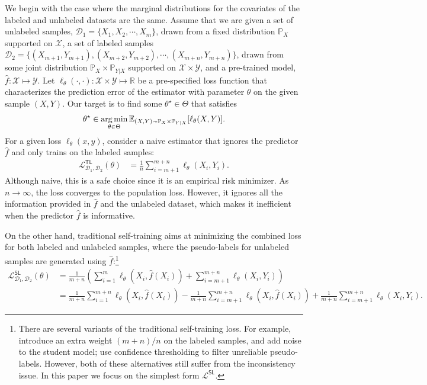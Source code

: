 We begin with the case where the marginal distributions for the covariates of the labeled and unlabeled datasets are the same. 
Assume that we are given a set of unlabeled samples, $\mathcal{D}_1 = \{X_1,X_2,\cdots, X_m\}$, drawn from a fixed distribution $\mathbb{P}_X$ supported on $\mathcal{X}$, a set of labeled samples $\mathcal{D}_2 =\{(X_{m+1}, Y_{m+1}), (X_{m+2}, Y_{m+2}), \cdots, (X_{m+n}, Y_{m+n})\}$, drawn from some joint distribution $\mathbb{P}_X\times \mathbb{P}_{Y|X}$ supported on $\mathcal{X}\times\mathcal{Y}$, and a pre-trained model,  $\hat f:\mathcal{X}\mapsto \mathcal{Y}$. Let $\ell_\theta(\cdot, \cdot):\mathcal{X}\times\mathcal{Y}\mapsto \mathbb{R}$ be a pre-specified loss function that characterizes the prediction error of the estimator with parameter $\theta$ on the given sample $(X, Y)$. 
Our target is to find some $\theta^\star\in\Theta$ that satisfies
\begin{align*}
    \theta^\star \in \operatorname*{arg\,min}_{\theta\in\Theta} \mathbb{E}_{(X, Y)\sim \mathbb{P}_{X}\times \mathbb{P}_{Y|X}}[\ell_\theta(X,Y)].
\end{align*}
For a given loss $\ell_\theta(x, y)$, consider a naive estimator that ignores the predictor $\hat f$ and only trains on the labeled samples:
\begin{align*}
\mathcal{L}^{\mathsf{TL}}_{\mathcal{D}_1,\mathcal{D}_2}(\theta) 
& = \frac{1}{n}    \sum_{i=m+1}^{m+n} \ell_\theta(X_i, Y_i).  
\end{align*}
Although naive, this is a safe choice since it is an empirical risk minimizer. As $n\rightarrow \infty$, the loss converges to the population loss. However, it ignores all the information provided in $\hat f$ and the unlabeled dataset, which makes it inefficient when the predictor $\hat f$ is informative.

On the other hand, traditional self-training aims at minimizing the combined loss for both labeled and unlabeled samples, where the pseudo-labels for unlabeled samples are generated using $\hat f$:\footnote{There are several variants of the traditional self-training loss. For example, \citet{xie2020self} introduce an extra weight $(m+n)/n$ on the labeled samples, and add noise to the student model; \citet{sohn2020fixmatch} use confidence thresholding to filter unreliable pseudo-labels. However, both of these alternatives still suffer from the inconsistency issue. In this paper we focus on the simplest form $\mathcal{L}^{\mathsf{SL}}$.  }
\begin{align*}
\mathcal{L}^{\mathsf{SL}}_{\mathcal{D}_1,\mathcal{D}_2}(\theta) 
& = \frac{1}{m+n}  \left(\sum_{i=1}^m \ell_\theta(X_i, \hat f(X_i)) + \sum_{i=m+1}^{m+n} \ell_\theta(X_i, Y_i)\right) \\
& = \frac{1}{m+n}  \sum_{i=1}^{m+n} \ell_\theta(X_i, \hat f(X_i)) -  \frac{1}{m+n} \sum_{i=m+1}^{m+n} \ell_\theta(X_i, \hat f(X_i))  + \frac{1}{m+n} \sum_{i=m+1}^{m+n} \ell_\theta(X_i, Y_i). 
\end{align*}

